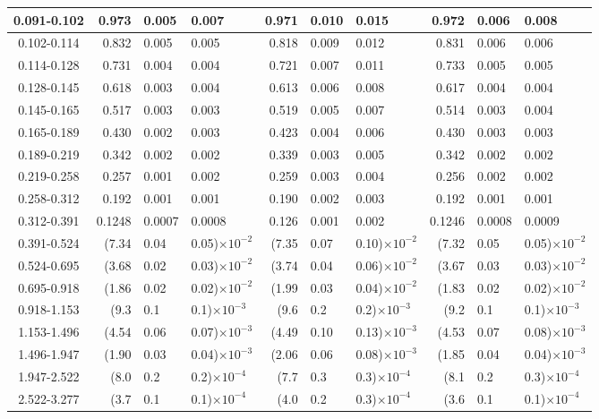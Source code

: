 \begin{table}[!htbp]
{\begin{tabular}{ | c | r@{$\pm$}l@{$\pm$}l | r@{$\pm$}l@{$\pm$}l |  r@{$\pm$}l@{$\pm$}l | }
0.091-0.102 & 0.973&0.005&0.007 & 0.971&0.010&0.015 & 0.972&0.006&0.008 \\ \hline
0.102-0.114 & 0.832&0.005&0.005 & 0.818&0.009&0.012 & 0.831&0.006&0.006 \\ \hline
0.114-0.128 & 0.731&0.004&0.004 & 0.721&0.007&0.011 & 0.733&0.005&0.005 \\ \hline
0.128-0.145 & 0.618&0.003&0.004 & 0.613&0.006&0.008 & 0.617&0.004&0.004 \\ \hline
0.145-0.165 & 0.517&0.003&0.003 & 0.519&0.005&0.007 & 0.514&0.003&0.004 \\ \hline
0.165-0.189 & 0.430&0.002&0.003 & 0.423&0.004&0.006 & 0.430&0.003&0.003 \\ \hline
0.189-0.219 & 0.342&0.002&0.002 & 0.339&0.003&0.005 & 0.342&0.002&0.002 \\ \hline
0.219-0.258 & 0.257&0.001&0.002 & 0.259&0.003&0.004 & 0.256&0.002&0.002 \\ \hline
0.258-0.312 & 0.192&0.001&0.001 & 0.190&0.002&0.003 & 0.192&0.001&0.001 \\ \hline
0.312-0.391 & 0.1248&0.0007&0.0008 & 0.126&0.001&0.002 & 0.1246&0.0008&0.0009 \\ \hline
0.391-0.524 & (7.34&0.04&0.05)$\times 10^{-2}$ & (7.35&0.07&0.10)$\times 10^{-2}$ & (7.32&0.05&0.05)$\times 10^{-2}$ \\ \hline
0.524-0.695 & (3.68&0.02&0.03)$\times 10^{-2}$ & (3.74&0.04&0.06)$\times 10^{-2}$ & (3.67&0.03&0.03)$\times 10^{-2}$ \\ \hline
0.695-0.918 & (1.86&0.02&0.02)$\times 10^{-2}$ & (1.99&0.03&0.04)$\times 10^{-2}$ & (1.83&0.02&0.02)$\times 10^{-2}$ \\ \hline
0.918-1.153 & (9.3&0.1&0.1)$\times 10^{-3}$ & (9.6&0.2&0.2)$\times 10^{-3}$ & (9.2&0.1&0.1)$\times 10^{-3}$ \\ \hline
1.153-1.496 & (4.54&0.06&0.07)$\times 10^{-3}$ & (4.49&0.10&0.13)$\times 10^{-3}$ & (4.53&0.07&0.08)$\times 10^{-3}$ \\ \hline
1.496-1.947 & (1.90&0.03&0.04)$\times 10^{-3}$ & (2.06&0.06&0.08)$\times 10^{-3}$ & (1.85&0.04&0.04)$\times 10^{-3}$ \\ \hline
1.947-2.522 & (8.0&0.2&0.2)$\times 10^{-4}$ & (7.7&0.3&0.3)$\times 10^{-4}$ & (8.1&0.2&0.3)$\times 10^{-4}$ \\ \hline
2.522-3.277 & (3.7&0.1&0.1)$\times 10^{-4}$ & (4.0&0.2&0.3)$\times 10^{-4}$ & (3.6&0.1&0.1)$\times 10^{-4}$ \\ \hline
\end{tabular}}
\end{table}
